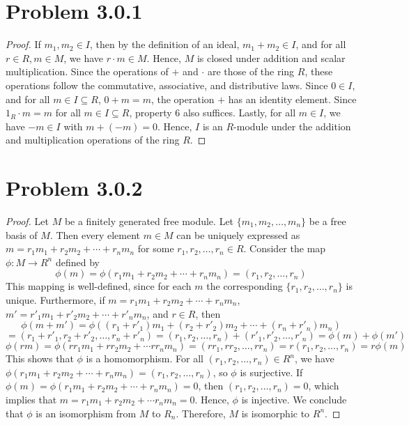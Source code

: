 \documentclass[12pt]{article}
\begin{document}
\newpage 

\section{Problem 3.0.1}

\begin{proof}
	If $m_1, m_2 \in I$, then by the definition of an ideal, $m_1 + m_2 \in I$, and for all $r \in R, m \in M$, we have $r \cdot m \in M$. Hence, $M$ is closed under addition and scalar multiplication. Since the operations of $+$ and $\cdot$ are those of the ring $R$, these operations follow the commutative, associative, and distributive laws. Since $0 \in I$, and for all $m \in I \subseteq R$, $0 + m = m$, the operation $+$ has an identity element. Since $1_R \cdot m = m$ for all $m \in I \subseteq R$, property 6 also suffices. Lastly, for all $m \in I$, we have $-m \in I$ with $m + (-m) = 0$. Hence, $I$ is an $R$-module under the addition and multiplication operations of the ring $R$.
\end{proof}

\newpage 

\section{Problem 3.0.2}

\begin{proof}
	Let $M$ be a finitely generated free module. Let $\{m_1, m_2, \ldots, m_n\}$ be a free basis of $M$. Then every element $m \in M$ can be uniquely expressed as $m = r_1 m_1 + r_2 m_2 + \cdots + r_n m_n$ for some $r_1, r_2, \ldots, r_n \in R$. Consider the map $\phi: M \longrightarrow R^n$ defined by
    $$\phi(m) = \phi(r_1 m_1 + r_2 m_2 + \cdots + r_n m_n) = (r_1, r_2, \ldots, r_n)$$
    This mapping is well-defined, since for each $m$ the corresponding $\{r_1, r_2, \ldots, r_n\}$ is unique. Furthermore, if $m = r_1 m_1 + r_2 m_2 + \cdots + r_n m_n$, $m' = r'_1 m_1 + r'_2 m_2 + \cdots + r'_n m_n$, and $r \in R$, then
    $$\phi(m+m') = \phi((r_1+r'_1)m_1 + (r_2+r'_2)m_2 + \cdots + (r_n+r'_n)m_n) $$
    $$= (r_1+r'_1, r_2+r'_2, \ldots, r_n+r'_n) = (r_1, r_2, \ldots, r_n) + (r'_1, r'_2, \ldots, r'_n) = \phi(m) + \phi(m')$$
    $$\phi(rm) = \phi(rr_1m_1 + rr_2m_2 + \cdots rr_nm_n) = (rr_1, rr_2, \ldots, rr_n) = r (r_1, r_2, \ldots, r_n) = r\phi(m)$$
    This shows that $\phi$ is a homomorphism. For all $(r_1, r_2, \ldots, r_n) \in R^n$, we have $\phi(r_1m_1 + r_2m_2 + \cdots + r_nm_n) = (r_1, r_2, \ldots, r_n)$, so $\phi$ is surjective. If $\phi(m) = \phi(r_1m_1 + r_2m_2 + \cdots + r_nm_n) = 0$, then $(r_1, r_2, \ldots, r_n) = 0$, which implies that $m = r_1m_1 + r_2m_2 + \cdots r_nm_n = 0$. Hence, $\phi$ is injective. We conclude that $\phi$ is an isomorphism from $M$ to $R_n$. Therefore, $M$ is isomorphic to $R^n$.
\end{proof}
\end{document}

